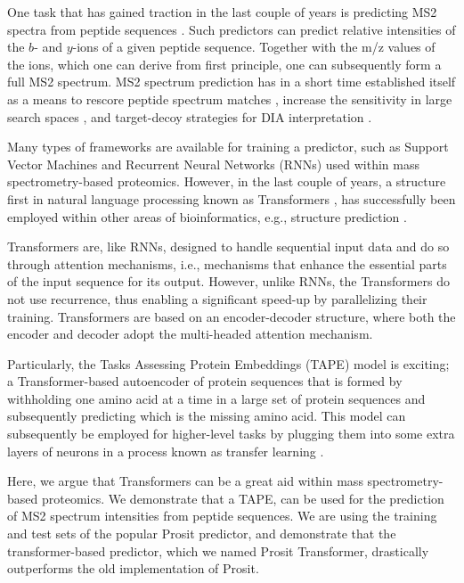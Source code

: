 \documentclass[10pt,a4paper]{article}
\begin{document}
One task that has gained traction in the last couple of years is predicting MS2 spectra from peptide sequences \cite{Degroeve2015-fh,Gessulat2019-el}. Such predictors can predict relative intensities of the $b$- and $y$-ions of a given peptide sequence. Together with the m/z values of the ions, which one can derive from first principle, one can subsequently form a full MS2 spectrum. MS2 spectrum prediction has in a short time established itself as a means to rescore peptide spectrum matches \cite{C_Silva2019-ja}, increase the sensitivity in large search spaces \cite{Wilhelm2021-mz}, and target-decoy strategies for DIA interpretation \cite{Searle2020-yk}.  
 
Many types of frameworks are available for training a predictor, such as Support Vector Machines and Recurrent Neural Networks (RNNs) used within mass spectrometry-based proteomics. However, in the last couple of years, a structure first in natural language processing \cite{devlin2018bert} known as Transformers \cite{Vaswani2017-sy}, has successfully been employed within other areas of bioinformatics, e.g., structure prediction \cite{Rao2019-qq,Bepler2021-ci}.

Transformers are, like RNNs, designed to handle sequential input data and do so through attention mechanisms, i.e., mechanisms that enhance the essential parts of the input sequence for its output. However, unlike RNNs, the Transformers do not use recurrence, thus enabling a significant speed-up by parallelizing their training. Transformers are based on an encoder-decoder structure, where both the encoder and decoder adopt the multi-headed attention mechanism\cite{Vaswani2017-sy}.

Particularly, the Tasks Assessing Protein Embeddings (TAPE) model \cite{Rao2019-qq} is exciting; a Transformer-based autoencoder of protein sequences that is formed by withholding one amino acid at a time in a large set of protein sequences and subsequently predicting which is the missing amino acid. This model can subsequently be employed for higher-level tasks by plugging them into some extra layers of neurons in a process known as transfer learning \cite{Rao2019-qq,Bepler2021-ci}.

Here, we argue that Transformers can be a great aid within mass spectrometry-based proteomics. We demonstrate that a TAPE, can be used for the prediction of MS2 spectrum intensities from peptide sequences. We are using the training and test sets of the popular Prosit \cite{Gessulat2019-el} predictor, and demonstrate that the transformer-based predictor, which we named Prosit Transformer, drastically outperforms the old implementation of Prosit. 
\end{document}
